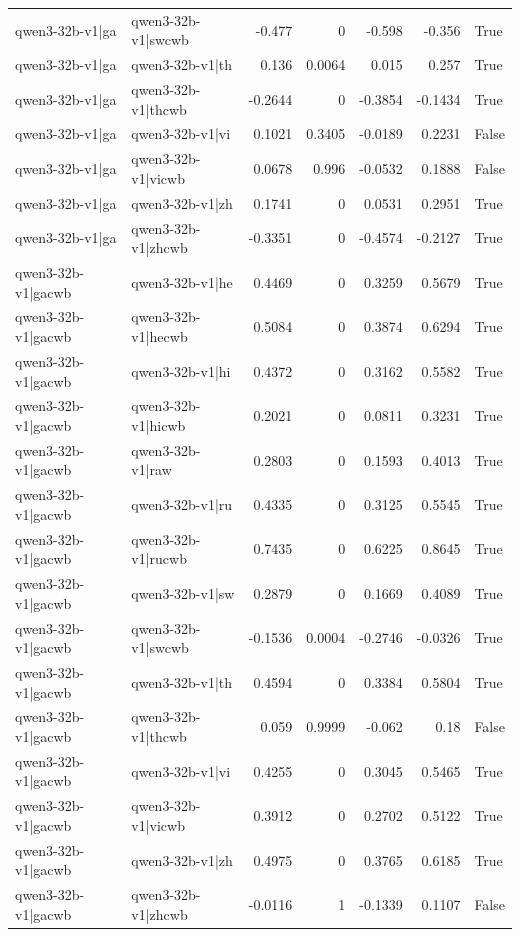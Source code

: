 \begin{table}
\begin{tabular}{l l r r r r l}
qwen3-32b-v1|ga & qwen3-32b-v1|swcwb & -0.477 & 0 & -0.598 & -0.356 & True \\
qwen3-32b-v1|ga & qwen3-32b-v1|th & 0.136 & 0.0064 & 0.015 & 0.257 & True \\
qwen3-32b-v1|ga & qwen3-32b-v1|thcwb & -0.2644 & 0 & -0.3854 & -0.1434 & True \\
qwen3-32b-v1|ga & qwen3-32b-v1|vi & 0.1021 & 0.3405 & -0.0189 & 0.2231 & False \\
qwen3-32b-v1|ga & qwen3-32b-v1|vicwb & 0.0678 & 0.996 & -0.0532 & 0.1888 & False \\
qwen3-32b-v1|ga & qwen3-32b-v1|zh & 0.1741 & 0 & 0.0531 & 0.2951 & True \\
qwen3-32b-v1|ga & qwen3-32b-v1|zhcwb & -0.3351 & 0 & -0.4574 & -0.2127 & True \\
qwen3-32b-v1|gacwb & qwen3-32b-v1|he & 0.4469 & 0 & 0.3259 & 0.5679 & True \\
qwen3-32b-v1|gacwb & qwen3-32b-v1|hecwb & 0.5084 & 0 & 0.3874 & 0.6294 & True \\
qwen3-32b-v1|gacwb & qwen3-32b-v1|hi & 0.4372 & 0 & 0.3162 & 0.5582 & True \\
qwen3-32b-v1|gacwb & qwen3-32b-v1|hicwb & 0.2021 & 0 & 0.0811 & 0.3231 & True \\
qwen3-32b-v1|gacwb & qwen3-32b-v1|raw & 0.2803 & 0 & 0.1593 & 0.4013 & True \\
qwen3-32b-v1|gacwb & qwen3-32b-v1|ru & 0.4335 & 0 & 0.3125 & 0.5545 & True \\
qwen3-32b-v1|gacwb & qwen3-32b-v1|rucwb & 0.7435 & 0 & 0.6225 & 0.8645 & True \\
qwen3-32b-v1|gacwb & qwen3-32b-v1|sw & 0.2879 & 0 & 0.1669 & 0.4089 & True \\
qwen3-32b-v1|gacwb & qwen3-32b-v1|swcwb & -0.1536 & 0.0004 & -0.2746 & -0.0326 & True \\
qwen3-32b-v1|gacwb & qwen3-32b-v1|th & 0.4594 & 0 & 0.3384 & 0.5804 & True \\
qwen3-32b-v1|gacwb & qwen3-32b-v1|thcwb & 0.059 & 0.9999 & -0.062 & 0.18 & False \\
qwen3-32b-v1|gacwb & qwen3-32b-v1|vi & 0.4255 & 0 & 0.3045 & 0.5465 & True \\
qwen3-32b-v1|gacwb & qwen3-32b-v1|vicwb & 0.3912 & 0 & 0.2702 & 0.5122 & True \\
qwen3-32b-v1|gacwb & qwen3-32b-v1|zh & 0.4975 & 0 & 0.3765 & 0.6185 & True \\
qwen3-32b-v1|gacwb & qwen3-32b-v1|zhcwb & -0.0116 & 1 & -0.1339 & 0.1107 & False \\

\end{tabular}
\end{table}
